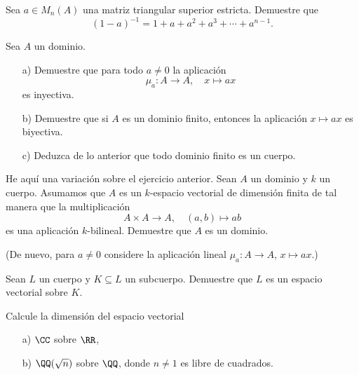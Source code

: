 \begin{ejercicio}
  Sea $a \in M_n (A)$ una matriz triangular superior estricta. Demuestre que
  $$(1-a)^{-1} = 1 + a + a^2 + a^3 + \cdots + a^{n-1}.$$
\end{ejercicio}

\begin{ejercicio}
  Sea $A$ un dominio.

  \begin{enumerate}
  \item[a)] Demuestre que para todo $a\ne 0$ la aplicación
    $$\mu_a\colon A \to A, \quad x \mapsto ax$$
    es inyectiva.

  \item[b)] Demuestre que si $A$ es un dominio finito, entonces la aplicación
    $x \mapsto ax$ es biyectiva.

  \item[c)] Deduzca de lo anterior que todo dominio finito es un cuerpo.
  \end{enumerate}
\end{ejercicio}

\begin{ejercicio}
  He aquí una variación sobre el ejercicio anterior. Sean $A$ un dominio y $k$
  un cuerpo. Asumamos que $A$ es un $k$-espacio vectorial de dimensión finita de
  tal manera que la multiplicación
  $$A\times A \to A, \quad (a,b) \mapsto ab$$
  es una aplicación $k$-bilineal. Demuestre que $A$ es un dominio.

  \noindent (De nuevo, para $a\ne 0$ considere la aplicación lineal
  $\mu_a\colon A \to A$, $x \mapsto ax$.)
\end{ejercicio}

\begin{ejercicio}
  Sean $L$ un cuerpo y $K \subseteq L$ un subcuerpo. Demuestre que $L$ es un
  espacio vectorial sobre $K$.
\end{ejercicio}

\begin{ejercicio}
  Calcule la dimensión del espacio vectorial

  \begin{enumerate}
  \item[a)] $\CC$ sobre $\RR$,

  \item[b)] $\QQ (\sqrt{n})$ sobre $\QQ$, donde $n\ne 1$ es libre de cuadrados.
  \end{enumerate}
\end{ejercicio}

